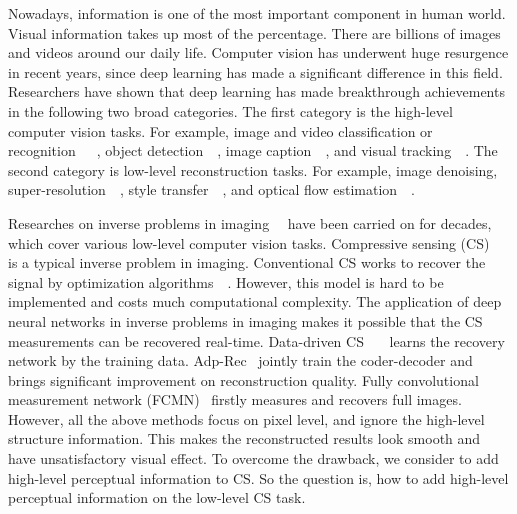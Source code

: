 \documentclass[runningheads]{llncs}
\begin{document}
Nowadays, information is one of the most important component in human world. Visual information takes up most of the percentage. There are billions of images and videos around our daily life. Computer vision has underwent huge resurgence in recent years, since deep learning has made a significant difference in this field.
Researchers have shown that deep learning has made breakthrough achievements in the following two broad categories. The first category is the high-level computer vision tasks. For example, image and video classification or recognition~\cite{8253595}~\cite{Wang_2017_CVPR}~\cite{Fu_2017_CVPR}, object detection~\cite{He_2017_ICCV}~\cite{Lin_2017_ICCV}, image caption~\cite{Gan_2017_CVPR}~\cite{Yao_2017_ICCV}, and visual tracking~\cite{Song_2017_ICCV}~\cite{Yun_2017_CVPR}.  The second category is low-level reconstruction tasks. For example, image denoising, super-resolution~\cite{Dong2014Learning}~\cite{Ledig_2017_CVPR}, style transfer~\cite{Johnson2016Perceptual}~\cite{Chen_2017_CVPR}, and optical flow estimation~\cite{Ilg_2017_CVPR}~\cite{Cheng_2017_ICCV}.

Researches on inverse problems in imaging~\cite{Lucas2018Using}~\cite{mccann2017convolutional} have been carried on for decades, which cover various low-level computer vision tasks.
Compressive sensing (CS)~\cite{donoho2006cs}~\cite{Baraniuk2007Compressive}~\cite{Baraniuk2011More} is a typical inverse problem in imaging. Conventional CS works to recover the signal by optimization algorithms~\cite{Candes2005Decoding}~\cite{Figueiredo2008Gradient}.
However, this model is hard to be implemented and costs much computational complexity.
The application of deep neural networks in inverse problems in imaging makes it possible that the CS measurements can be recovered real-time.
Data-driven CS~\cite{Mousavi2016A}~\cite{Kulkarni2016ReconNet}~\cite{Mousavi2017Learning} learns the recovery network by the training data. Adp-Rec~\cite{Xie2017Adaptive} jointly train the coder-decoder and brings significant improvement on reconstruction quality. Fully convolutional measurement network (FCMN)~\cite{xie2017Fully} firstly measures and recovers full images.
However, all the above methods focus on pixel level, and ignore the high-level structure information. This makes the reconstructed results look smooth and have unsatisfactory visual effect.
To overcome the drawback, we consider to add high-level  perceptual information to CS. So the question is, how to add high-level perceptual information on the low-level CS task.
\end{document}
